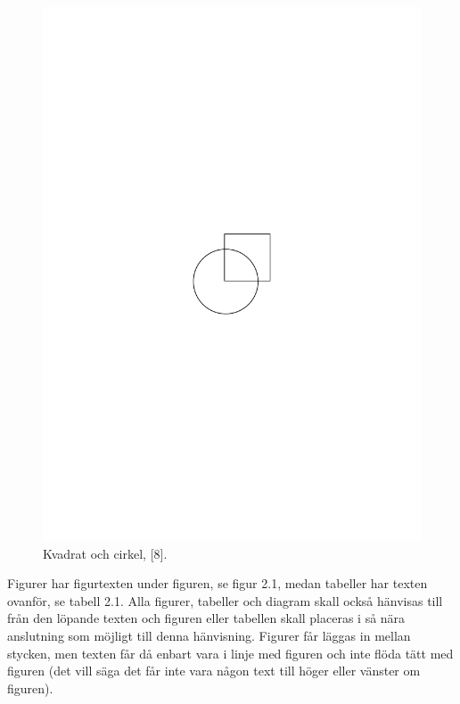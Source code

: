\documentclass[a4paper,12pt]{article} %
\begin{document}
\begin{figure}[h]
\begin{center}
\includegraphics[scale=0.5]{img/cirkvad}
\end{center}
\caption{Kvadrat och cirkel, [8].}
\label{cir_kvad}
\end{figure}

Figurer har figurtexten under figuren, se figur 2.1, medan tabeller har texten ovanför, se tabell 2.1. Alla figurer, tabeller och diagram skall också hänvisas till från den löpande texten och figuren eller tabellen skall placeras i så nära anslutning som möjligt till denna hänvisning. Figurer får läggas in mellan stycken, men texten får då enbart vara i linje med figuren och inte flöda tätt med figuren (det vill säga det får inte vara någon text till höger eller vänster om figuren). \\
\end{document}
